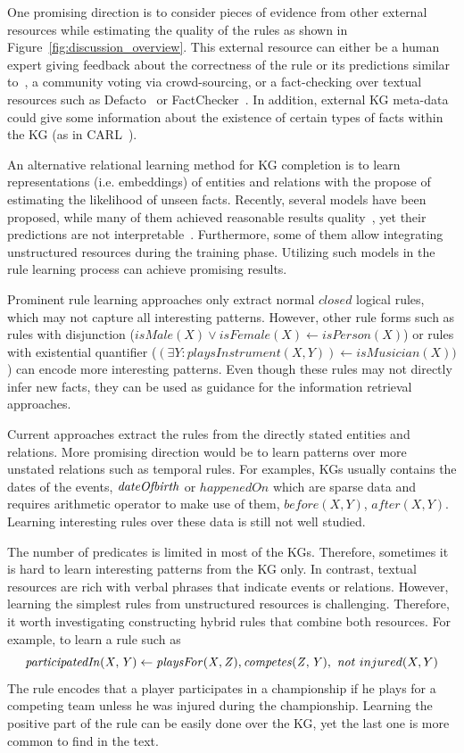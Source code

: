 One promising direction is to consider pieces of evidence from other external resources while estimating the quality of the rules as shown in Figure~\ref{fig:discussion_overview}. This external resource can either be a human expert giving feedback about the correctness of the rule or its predictions similar to~\cite{Dzyuba2017}, a community voting via crowd-sourcing, or a fact-checking over textual resources such as Defacto~\cite{defacto} or FactChecker~\cite{factchecker}. In addition, external KG meta-data could give some information about the existence of certain types of facts within the KG (as in CARL~\cite{carl}).

An alternative relational learning method for KG completion is to learn representations (i.e. embeddings) of entities and relations with the propose of estimating the likelihood of unseen facts. Recently, several models have been proposed, while many of them achieved reasonable results quality~\cite{Wang2017}, yet their predictions are not interpretable~\cite{Shakerin2018}. Furthermore, some of them allow integrating unstructured resources during the training phase. Utilizing such models in the rule learning process can achieve promising results.%

Prominent rule learning approaches only extract normal $closed$ logical rules, which may not capture all interesting patterns. However, other rule forms such as rules with disjunction (\eg $isMale(X) \vee isFemale(X) \leftarrow isPerson(X)$) or rules with existential quantifier (\eg $(\exists Y: playsInstrument(X, Y)) \leftarrow isMusician(X))$) can encode more interesting patterns. Even though these rules may not directly infer new facts, they can be used as guidance for the information retrieval approaches.


 Current approaches extract the rules from the directly stated entities and relations. More promising direction would be to learn patterns over more unstated relations such as temporal rules. For examples, KGs usually contains the dates of the events, \eg $\mathit{dateOfbirth}$ or $happenedOn$ which are sparse data and requires arithmetic operator to make use of them, \eg $before(X,Y)$, $after(X,Y)$. Learning interesting rules over these data is still not well studied.


 The number of predicates is limited in most of the KGs. Therefore, sometimes it is hard to learn interesting patterns from the KG only. In contrast, textual resources are rich with verbal phrases that indicate events or relations. However, learning the simplest rules from unstructured resources is challenging. Therefore, it worth investigating constructing hybrid rules that combine both resources.  For example, to learn a rule such as
\[\mathit{participatedIn(X,Y)} \leftarrow \mathit{playsFor(X,Z)}, \mathit{competes(Z,Y)},\ \mathit{not}~ injured(X,Y)\]
The rule encodes that a player participates in a championship if he plays for a competing team unless he was injured during the championship. Learning the positive part of the rule can be easily done over the KG, yet the last one is more common to find in the text. 




